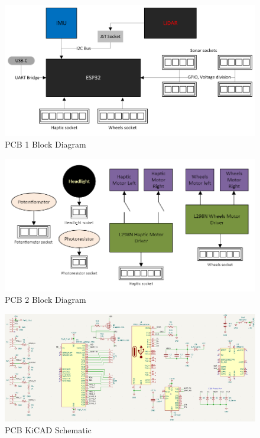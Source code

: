 \begin{figure}[H]
	\centering
	\includegraphics[width=\textwidth]{./Images/PCB1-Block-Diagram.png}
	\caption{\label{fig:pcb}PCB 1 Block Diagram}
\end{figure}

\begin{figure}[H]
	\centering
	\includegraphics[width=\textwidth]{./Images/pcb2-block2.png}
	\caption{\label{fig:pcb2}PCB 2 Block Diagram}
\end{figure}

\begin{figure}[H]
	\centering
	\includegraphics[width=\textwidth]{./Images/PCB1-sch.png}
	\caption{\label{fig:pcb-sch}PCB KiCAD Schematic}
\end{figure}


